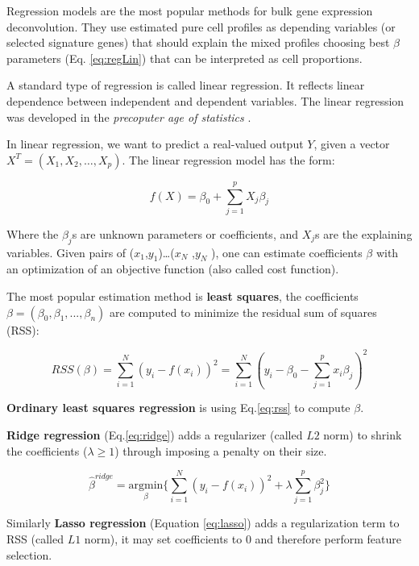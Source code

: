 \documentclass[12pt,]{book}
\theoremstyle{definition}
\theoremstyle{definition}
\theoremstyle{definition}
\theoremstyle{remark}
\begin{document}
Regression models are the most popular methods for bulk gene expression
deconvolution. They use estimated pure cell profiles as depending
variables (or selected signature genes) that should explain the mixed
profiles choosing best \(\beta\) parameters (Eq. \eqref{eq:regLin}) that
can be interpreted as cell proportions.

A standard type of regression is called linear regression. It reflects
linear dependence between independent and dependent variables. The
linear regression was developed in the \emph{precoputer age of
statistics} \citep{Hastie2009}.

In linear regression, we want to predict a real-valued output \(Y\),
given a vector \(X^T = (X_1,X_2,… ,X_p)\). The linear regression model
has the form:

\begin{equation}
f(X) = \beta_0 + \sum_{j=1}^{p} X_j\beta_j \label{eq:regLin}
\end{equation}

Where the \(\beta_j\)s are unknown parameters or coefficients, and
\(X_j\)s are the explaining variables. Given pairs of
(\(x_1\),\(y_1\))\ldots{}(\(x_N\) ,\(y_N\) ), one can estimate
coefficients \(\beta\) with an optimization of an objective function
(also called cost function).

The most popular estimation method is \textbf{least squares}, the
coefficients \(\beta = (\beta_0, \beta_1, ..., \beta_n)\) are computed
to minimize the residual sum of squares (RSS):

\begin{equation}
RSS(\beta) = \sum_{i = 1}^{N}(y_i - f(x_i))^2 = \sum_{i = 1}^{N}(y_i - \beta_0 - \sum_{j=1}^p x_i\beta_j)^2 \label{eq:rss}
\end{equation}

\textbf{Ordinary least squares regression} is using Eq.\eqref{eq:rss} to
compute \(\beta\).

\textbf{Ridge regression} (Eq.\eqref{eq:ridge}) adds a regularizer (called
\(L2\) norm) to shrink the coefficients (\(\lambda \geq 1\)) through
imposing a penalty on their size.

\begin{equation}
\hat{\beta}^{ridge} = \underset{\beta}{\text{argmin}}\{\sum_{i = 1}^{N}(y_i - f(x_i))^2 + \lambda\sum_{j=1}^{p}\beta^2_j\}\label{eq:ridge}
\end{equation}

Similarly \textbf{Lasso regression} (Equation \eqref{eq:lasso}) adds a
regularization term to RSS (called \(L1\) norm), it may set coefficients
to 0 and therefore perform feature selection.
\end{document}
